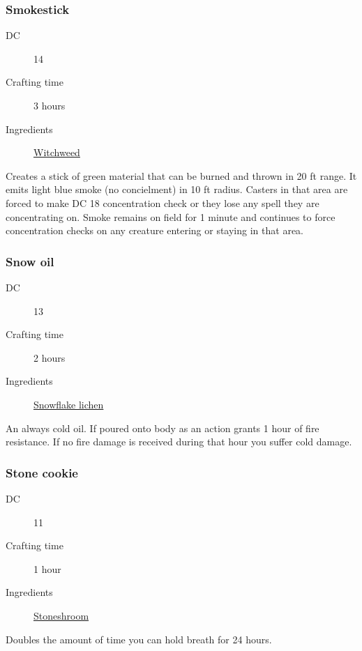 \subsubsection{Smokestick}
\label{Smokestick}

\begin{description}
\item [DC] 14 \survival
\item [Crafting time] 3 hours
\item [Ingredients] \hyperref[Witchweed]{Witchweed}
\end{description}

Creates a stick of green material that can be burned and thrown in 20 ft range. It emits light blue smoke 
(no concielment) in 10 ft radius. Casters in that area are forced to make DC 18 concentration check 
or they lose any spell they are concentrating on. 
Smoke remains on field for 1 minute and continues to force concentration checks on any creature entering or staying in that area.

\subsubsection{Snow oil}
\label{Snow oil}

\begin{description}
\item [DC] 13 \survival
\item [Crafting time] 2 hours
\item [Ingredients] \hyperref[Snowflake Lichen]{Snowflake lichen}
\end{description}

An always cold oil. If poured onto body as an action grants 1 hour of fire resistance. 
If no fire damage is received during that hour you suffer  cold damage.

\subsubsection{Stone cookie}
\label{Stone cookie}

\begin{description}
\item [DC] 11 \survival
\item [Crafting time] 1 hour
\item [Ingredients] \hyperref[Stoneshroom]{Stoneshroom}
\end{description}

Doubles the amount of time you can hold breath for 24 hours.

